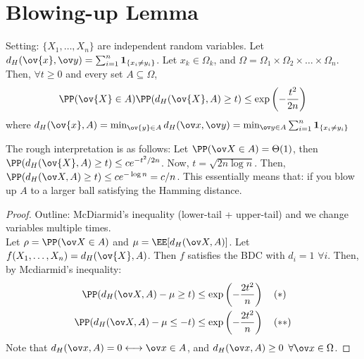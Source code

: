 \section{Blowing-up Lemma}
\begin{lemma}
Setting: $\{X_1, \dots, X_n\}$ are independent random variables. Let $d_H(\ov{x}, \ov y) = \sum_{i=1}^n \mathbf{1}_{\{x_i \neq y_i\}}$. Let $x_k \in \Omega_k$, and $\Omega = \Omega_1 \times \Omega_2 \times \dots \times \Omega_n$. Then, $\forall t \geq 0$ and every set $A \subseteq \Omega$,
\begin{equation}
    \PP(\ov{X} \in A) \PP(d_H(\ov{X}, A) \geq t) \leq \exp\left(-\frac{t^2}{2n}\right)
\end{equation}
where $d_H(\ov{x},A) = \min_{\ov{y} \in A} d_H(\ov x, \ov y) = \min_{\ov y\in A} \sum_{i=1}^n \mathbf{1}_{\{x_i \neq y_i\}}$
\end{lemma}
The rough interpretation is as follows: Let $\PP(\ov X \in A) = \Theta(1)$, then $\PP(d_H(\ov{X}, A) \geq t) \leq ce^{-t^2/2n}$. Now, $t = \sqrt{2n \log n}$. Then,
$\PP(d_H(\ov X, A) \geq t) \leq ce^{-\log n} = c/n$. This essentially means that: if you blow up $A$ to a larger ball satisfying the Hamming distance.
\begin{proof}
Outline: McDiarmid's inequality (lower-tail + upper-tail) and we change variables multiple times. \\
Let $\rho = \PP(\ov X \in A)$ and $\mu = \EE[d_H(\ov X, A)]$. Let $f(X_1, \dots, X_n) = d_H(\ov{X}, A) $. Then $f$ satisfies the BDC with $d_i = 1$ $\forall i$. Then, by Mcdiarmid's inequality:
\[
\begin{split}
    \PP(d_H(\ov X, A) - \mu \geq t) &\leq \exp\left(-\frac{2t^2}{n}\right) \quad (*) \\
    \PP(d_H(\ov X, A) - \mu \leq -t) &\leq \exp\left(-\frac{2t^2}{n}\right) \quad (**)
\end{split}
\]
Note that $d_H(\ov x, A) = 0 \longleftrightarrow \ov x \in A$, and $d_H(\ov x, A) \geq 0$ $\forall \ov x \in \Omega$.
\end{proof}